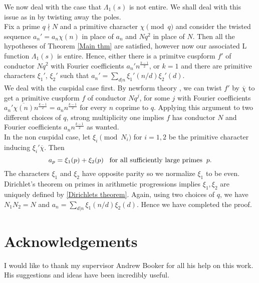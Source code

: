\documentclass[a4paper,12.5pt]{amsart}
\theoremstyle{definition}
\theoremstyle{remark}
\begin{document}
                 We now deal with the case that $\Lambda_1(s)$ is not entire. We shall deal with this issue as in \cite{Converse} by twisting away the poles. \\  Fix a prime $q \nmid N$ and a primitive character $\chi \pmod{q}$ and consider the twisted sequence $a_n'= a_n \chi(n)$ in place of $a_n$ and $Nq^2$ in place of $N$. Then all the hypotheses of Theorem \ref{Main thm} are satisfied, however now our associated L function $\Lambda_1(s)$ is entire. Hence, either there is a primitve cuspform $f'$ of conductor $Nq^2$ with Fourier coefficients $a_n' n^{  \frac{k-1}{2}  }$, or $k=1$ and there are primitive characters $\xi_1'$, $\xi_2'$ such that $a_n'= \sum_{d|n} \xi_1' (n/d) \xi_2'(d)$. \\
                 We deal with the cuspidal case first. By newform theory \cite[Theorem~3.2]{atkin1978twists}, we can twist $f'$ by $\overline{\chi}$ to get a primitive cuspform $f$ of conductor $Nq^j$, for some $j$ with Fourier coefficients $ a_n' \overline{\chi(n)} n^{   \frac{k-1}{2}  }= a_n n^{   \frac{k-1}{2} }$ for every $n$ coprime to $q$. Applying this argument to two different choices of $q$, strong multiplicity one implies $f$ has conductor $N$ and Fourier coefficients $a_n n^{\frac{k-1}{2}}$ as wanted. \\
                 In the non cuspidal case, let $\xi_i  \pmod{N_i}$ for $i=1,2$ be the primitive character inducing $ \xi_i' \overline{\chi}$. Then 
                 \begin{equation}{\label{Dirichlets theorem}}
                     a_p = \xi_1(p)+ \xi_2(p) \; \; \; \text{for all sufficiently large primes} \; \; p.
                 \end{equation} The characters $\xi_1$ and $\xi_2$ have opposite parity so we  normalize $\xi_1$ to be even. Dirichlet's theorem on primes in arithmetic progressions implies $\xi_1, \xi_2$ are uniquely defined by \eqref{Dirichlets theorem}. Again, using two choices of $q$, we have $N_1N_2= N$ and $ a_n = \sum_{d|n} \xi_1(n/d) \xi_2 (d)$. Hence we have completed the proof. 
                  
                 \section{Acknowledgements}
                 I would like to thank my supervisor Andrew Booker for all his help on this work. His suggestions and ideas have been incredibly useful. 
                 
\end{document}
